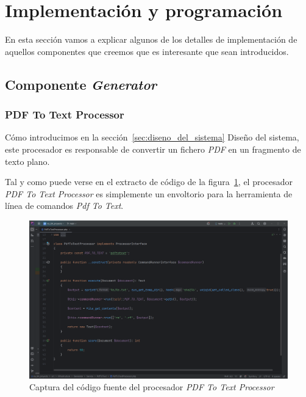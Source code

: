 \section{Implementación y programación}\label{sec:implemetacion_y_programacion}

En esta sección vamos a explicar algunos de los detalles de implementación de aquellos componentes que creemos que es
interesante que sean introducidos.

\subsection*{Componente \textit{Generator}}

\subsubsection*{PDF To Text Processor}

Cómo introducimos en la sección~\ref{sec:diseno_del_sistema} Diseño del sistema, este procesador es responsable de
convertir un fichero \textit{PDF} en un fragmento de texto plano.

Tal y como puede verse en el extracto de código de la figura~\ref{fig:chapter_4.4.pdf_to_text_processor}, el procesador
\textit{PDF To Text Processor} es simplemente un envoltorio para la herramienta de línea de comandos
\textit{Pdf To Text}.

\begin{figure}[ht]
    \begin{center}
        \includegraphics[width=\textwidth]{./chapter/4/images/chapter_4.4.pdf_to_text_processor}
        \caption{Captura del código fuente del procesador \textit{PDF To Text Processor}}
        \label{fig:chapter_4.4.pdf_to_text_processor}
    \end{center}
\end{figure}

